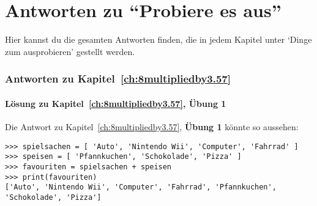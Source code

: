 

\chapter{Antworten zu ``Probiere es aus''}\label{app:answers}

Hier kannst du die gesamten Antworten finden, die in jedem Kapitel unter `Dinge zum ausprobieren' gestellt werden.

\subsection*{Antworten zu Kapitel~\ref{ch:8multipliedby3.57}}

\subsubsection{Lösung zu Kapitel~\ref{ch:8multipliedby3.57}, Übung 1}
Die Antwort zu Kapitel~\ref{ch:8multipliedby3.57}, \textbf{Übung 1} könnte so aussehen:

\begin{Verbatim}[frame=single]
>>> spielsachen = [ 'Auto', 'Nintendo Wii', 'Computer', 'Fahrrad' ]
>>> speisen = [ 'Pfannkuchen', 'Schokolade', 'Pizza' ]
>>> favouriten = spielsachen + speisen
>>> print(favouriten)
['Auto', 'Nintendo Wii', 'Computer', 'Fahrrad', 'Pfannkuchen', 'Schokolade', 'Pizza']
\end{Verbatim}

